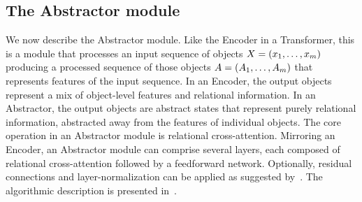 \subsection{The Abstractor module}\label{ssec:abstractor_module}

We now describe the Abstractor module. Like the Encoder in a Transformer, this is a module that processes an input sequence of objects $X = \left(x_1, \ldots, x_m\right)$ producing a processed sequence of those objects $A = \left(A_1, \ldots, A_m\right)$ that represents features of the input sequence. In an Encoder, the output objects represent a mix of object-level features and relational information. In an Abstractor, the output objects are abstract states that represent purely relational information, abstracted away from the features of individual objects. The core operation in an Abstractor module is relational cross-attention. Mirroring an Encoder, an Abstractor module can comprise several layers, each composed of relational cross-attention followed by a feedforward network. Optionally, residual connections and layer-normalization can be applied as suggested by~\citet{vaswani2017attention}. The algorithmic description is presented in~.

